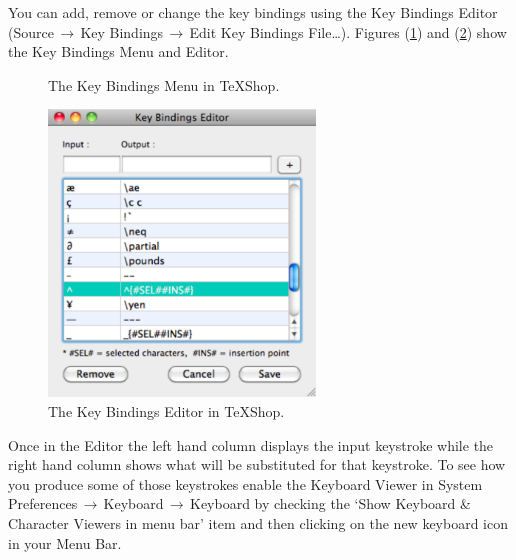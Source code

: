 \documentclass[letterpaper,11pt]{article}
\newcommand{\TS}{\textsf{\TeX Shop}}
\newcommand{\mnu}[1]{\textsf{#1}}
\newcommand{\To}{\,\(\to\)\,}
\begin{document}
You can add, remove or change the key bindings using the Key Bindings Editor (\mnu{Source}\To\mnu{Key Bindings}\To\mnu{Edit Key Bindings File…}). Figures (\ref{fig:keybindingmenu}) and (\ref{fig:keybindeditor}) show the \mnu{Key Bindings} Menu and Editor.
\begin{figure}
\centering
{}
\caption{The Key Bindings Menu in \TS.}
\label{fig:keybindingmenu}
\end{figure}
\begin{figure}
\centering
\includegraphics[height=3in]{figs/KeyBindingEditor}
\caption{The Key Bindings Editor in \TS.}
\label{fig:keybindeditor}
\end{figure}
Once in the Editor the left hand column displays the input keystroke while the right hand column shows what will be substituted for that keystroke. To see how you produce some of those keystrokes enable the Keyboard Viewer in \mnu{System Preferences}\To\mnu{Keyboard}\To\mnu{Keyboard} by checking the `\mnu{Show Keyboard \& Character Viewers in menu bar}' item and then clicking on the new keyboard icon in your Menu Bar.
\end{document}
